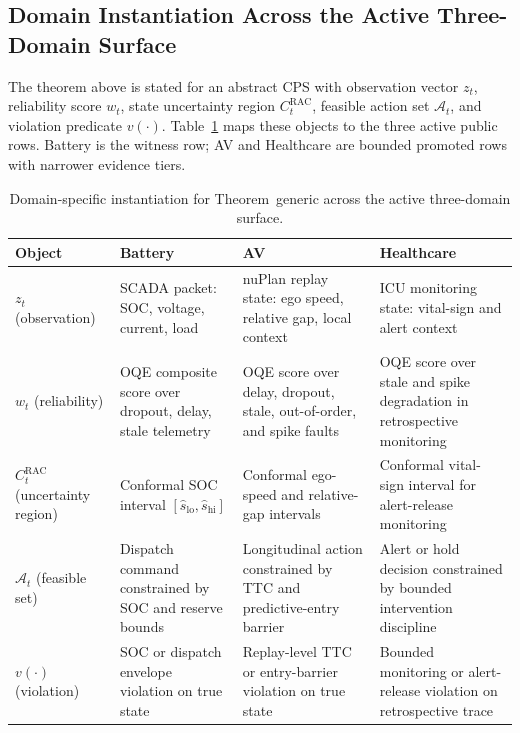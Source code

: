 
\providecommand{\domainblockid}{generic}
\providecommand{\domainblocktitle}{\domainblockid}

\subsection{Domain Instantiation Across the Active Three-Domain Surface}
\label{sec:domain-instantiation-\domainblockid}

The theorem above is stated for an abstract CPS with observation vector
$z_t$, reliability score $w_t$, state uncertainty region
$C_t^{\text{RAC}}$, feasible action set $\mathcal{A}_t$, and violation
predicate $v(\cdot)$.  Table~\ref{tab:domain-instantiation-\domainblockid}
maps these objects to the three active public rows.  Battery is the witness
row; AV and Healthcare are bounded promoted rows with narrower evidence tiers.

\begin{table}[htbp]
\centering
\small
\caption{Domain-specific instantiation for Theorem~\domainblocktitle{} across the active three-domain surface.}
\label{tab:domain-instantiation-\domainblockid}
\begin{tabular}{p{2.6cm}p{3.3cm}p{3.3cm}p{3.3cm}}
\toprule
\textbf{Object} & \textbf{Battery} & \textbf{AV} & \textbf{Healthcare} \\
\midrule
$z_t$ (observation)
  & SCADA packet: SOC, voltage, current, load
  & nuPlan replay state: ego speed, relative gap, local context
  & ICU monitoring state: vital-sign and alert context \\
\addlinespace
$w_t$ (reliability)
  & OQE composite score over dropout, delay, stale telemetry
  & OQE score over delay, dropout, stale, out-of-order, and spike faults
  & OQE score over stale and spike degradation in retrospective monitoring \\
\addlinespace
$C_t^{\text{RAC}}$ (uncertainty region)
  & Conformal SOC interval $[\hat{s}_{\text{lo}},\hat{s}_{\text{hi}}]$
  & Conformal ego-speed and relative-gap intervals
  & Conformal vital-sign interval for alert-release monitoring \\
\addlinespace
$\mathcal{A}_t$ (feasible set)
  & Dispatch command constrained by SOC and reserve bounds
  & Longitudinal action constrained by TTC and predictive-entry barrier
  & Alert or hold decision constrained by bounded intervention discipline \\
\addlinespace
$v(\cdot)$ (violation)
  & SOC or dispatch envelope violation on true state
  & Replay-level TTC or entry-barrier violation on true state
  & Bounded monitoring or alert-release violation on retrospective trace \\
\bottomrule
\end{tabular}
\end{table}
